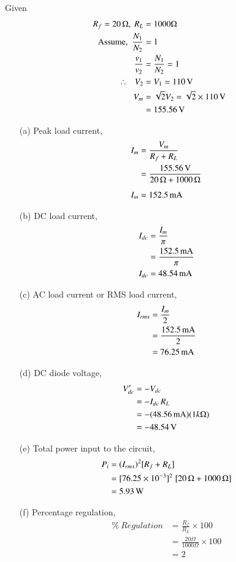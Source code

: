 \begin{solution}
Given 
\begin{align*}
R_f =20\, \Omega, \ R_L & = 1000 \Omega\\
\text{Assume, \ } \frac{N_1}{N_2} & = 1\\
\frac{v_1}{v_2} & = \frac{N_1}{N_2} = 1\\
\therefore ~~~ V_2 & = V_1 = 110 \operatorname{\mathrm{V}}\\
V_m & = \sqrt{2} V_{2}=\sqrt{2}\times 110 \operatorname{\mathrm{V}}\\
& = 155.56 \operatorname{\mathrm{V}} 
\end{align*}

\begin{itemize}
\item[(a)] Peak load current,
\begin{align*}
I_m & = \frac{V_m}{R_f + R_L}\\
& = \frac{155.56 \operatorname{\mathrm{V}}}{20\,\Omega + 1000\,\Omega}\\[5pt]
I_m & = 152.5 \operatorname{mA}
\end{align*}

\item[(b)] DC load current,
\begin{align*}
I_{dc} & = \frac{I_m}{\pi}\\
& = \frac{152.5 \operatorname{mA}}{\pi}\\
I_{dc} &  = 48.54 \operatorname{mA}
\end{align*}

\itemsep=2pt
\item[(c)] AC load current or RMS load current,
\begin{align*}
I_{rms} & = \frac{I_m}{2}\\
& = \frac{152.5 \operatorname{mA}}{2}\\
& = 76.25 \operatorname{mA}
\end{align*}

\item[(d)] DC diode voltage,
\begin{align*}
V'_{dc} & = - V_{dc}\\
& = - I_{dc}\, R_L\\
& = - (48.56 \operatorname{mA}) (1 k\Omega)\\
& = - 48.54 \operatorname{\mathrm{V}}
\end{align*}

\item[(e)] Total power input to the circuit,
\begin{align*}
P_i & = (I_{rms})^2 [R_f + R_L]\\
& = [76.25 \times 10^{-3}]^2\; [20\,\Omega + 1000\,\Omega]\\
& = 5.93 \operatorname{W}
\end{align*}

\item[(f)] Percentage regulation,
\begin{align*}
\% ~ Regulation &  = \frac{R_f}{R_L} \times 100\\
& = \frac{20 \Omega}{1000 \Omega} \times 100\\
& = 2
\end{align*}
\end{itemize}
\vskip -1cm
\end{solution}

